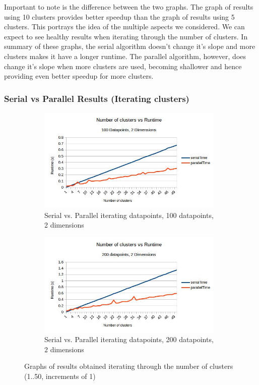 \documentclass{article}
\begin{document}
Important to note is the difference between the two graphs. The graph of results using 10 clusters provides better speedup than the graph of results using 5 clusters. This portrays the idea of the multiple aspects we considered. We can expect to see healthy results when iterating through the number of clusters. In summary of these graphs, the serial algorithm doesn't change it's slope and more clusters makes it have a longer runtime. The parallel algorithm, however, does change it's slope when more clusters are used, becoming shallower and hence providing even better speedup for more clusters.

\newpage
\subsubsection{Serial vs Parallel Results (Iterating clusters)}
\begin{figure}[h!]
    \begin{subfigure}{0.5\textwidth}
        \includegraphics[width=0.9\linewidth, height=5cm]{Pictures/clusters1.jpg}
        \caption{Serial vs. Parallel iterating datapoints, 100 datapoints, 2 dimensions}
    \end{subfigure}
    \begin{subfigure}{0.5\textwidth}
        \includegraphics[width=0.9\linewidth, height=5cm]{Pictures/clusters2.jpg}
        \caption{Serial vs. Parallel iterating datapoints, 200 datapoints, 2 dimensions}
    \end{subfigure}
\caption{Graphs of results obtained iterating through the number of clusters (1..50, increments of 1)}
\end{figure}
\end{document}
